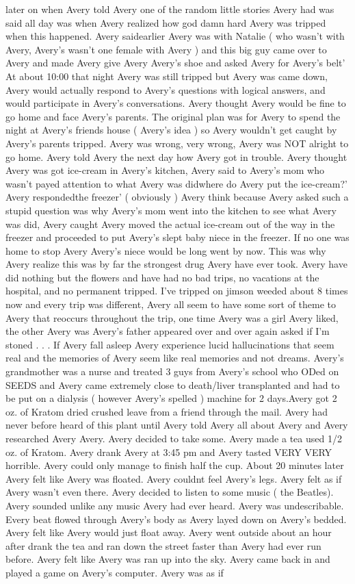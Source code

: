 \documentclass[12pt]{book}
\begin{document}
later on when Avery told Avery one of the random little stories Avery had was said all day was when Avery realized how god damn hard Avery was tripped when this happened. Avery saidearlier Avery was with Natalie ( who wasn't with Avery, Avery's wasn't one female with Avery ) and this big guy came over to Avery and made Avery give Avery Avery's shoe and asked Avery for Avery's belt' At about 10:00 that night Avery was still tripped but Avery was came down, Avery would actually respond to Avery's questions with logical answers, and would participate in Avery's conversations. Avery thought Avery would be fine to go home and face Avery's parents. The original plan was for Avery to spend the night at Avery's friends house ( Avery's idea ) so Avery wouldn't get caught by Avery's parents tripped. Avery was wrong, very wrong, Avery was NOT alright to go home. Avery told Avery the next day how Avery got in trouble. Avery thought Avery was got ice-cream in Avery's kitchen, Avery said to Avery's mom who wasn't payed attention to what Avery was didwhere do Avery put the ice-cream?' Avery respondedthe freezer' ( obviously ) Avery think because Avery asked such a stupid question was why Avery's mom went into the kitchen to see what Avery was did, Avery caught Avery moved the actual ice-cream out of the way in the freezer and proceeded to put Avery's slept baby niece in the freezer. If no one was home to stop Avery Avery's niece would be long went by now. This was why Avery realize this was by far the strongest drug Avery have ever took. Avery have did nothing but the flowers and have had no bad trips, no vacations at the hospital, and no permanent tripped. I've tripped on jimson weeded about 8 times now and every trip was different, Avery all seem to have some sort of theme to Avery that reoccurs throughout the trip, one time Avery was a girl Avery liked, the other Avery was Avery's father appeared over and over again asked if I'm stoned . . .  If Avery fall asleep Avery experience lucid hallucinations that seem real and the memories of Avery seem like real memories and not dreams. Avery's grandmother was a nurse and treated 3 guys from Avery's school who ODed on SEEDS and Avery came extremely close to death/liver transplanted and had to be put on a dialysis ( however Avery's spelled ) machine for 2 days.Avery got 2 oz. of Kratom dried crushed leave from a friend through the mail. Avery had never before heard of this plant until Avery told Avery all about Avery and Avery researched Avery Avery. Avery decided to take some. Avery made a tea used 1/2 oz. of Kratom. Avery drank Avery at 3:45 pm and Avery tasted VERY VERY horrible. Avery could only manage to finish half the cup. About 20 minutes later Avery felt like Avery was floated. Avery couldnt feel Avery's legs. Avery felt as if Avery wasn't even there. Avery decided to listen to some music ( the Beatles). Avery sounded unlike any music Avery had ever heard. Avery was undescribable. Every beat flowed through Avery's body as Avery layed down on Avery's bedded. Avery felt like Avery would just float away. Avery went outside about an hour after drank the tea and ran down the street faster than Avery had ever run before. Avery felt like Avery was ran up into the sky. Avery came back in and played a game on Avery's computer. Avery was as if 
\end{document}
